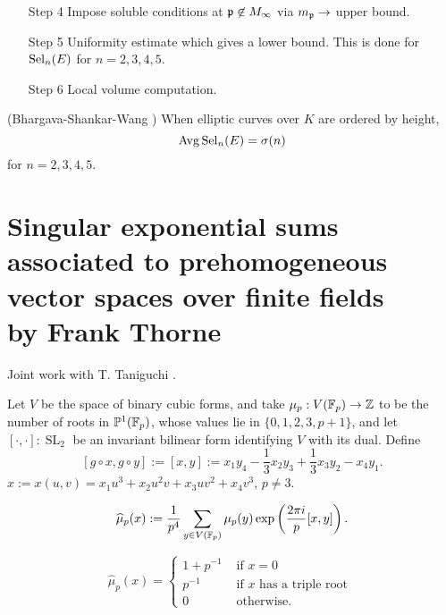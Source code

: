 \documentclass[12pt,amsfont]{amsart}
\begin{document}
\begin{itemize}
\begin{pbm}
\end{pbm}
\item[Step 4]
Impose soluble conditions at $\mathfrak{p} \not \in M_\infty$ via $m_{\mathfrak{p}} \rightarrow$ upper bound. 
\item[Step 5]
Uniformity estimate which gives a lower bound. This is done for $\operatorname{Sel}_n(E)$ for $n = 2, 3, 4, 5$. 
\item[Step 6]
Local volume computation. 

\end{itemize}

\begin{thm} (Bhargava-Shankar-Wang ) When elliptic curves over $K$ are ordered by height, 
\[\operatorname{Avg} \operatorname{Sel}_n(E) = \sigma(n) \]
for $n = 2, 3, 4, 5$. 
\end{thm}
\renewcommand{\thesubsection}{\arabic{section}.R}
\begingroup
\renewcommand{\addcontentsline}[3]{}%
\endgroup


\newpage
\section{Singular exponential sums associated to prehomogeneous vector spaces over finite fields \\
by Frank Thorne}\label{9}
\renewcommand{\thesubsection}{\arabic{section}.\arabic{subsection}}


Joint work with T. Taniguchi . 

\begin{xmp} Let $V$ be the space of binary cubic forms, and take $\mu_p: V({\mathbb F}_p) \rightarrow {\mathbb Z}$ to be the number of roots in $\mathbb{P}^1({\mathbb F}_p)$, whose values lie in $\{0,1,2,3, p+1\}$, and let $[ \cdot, \cdot] : \operatorname{SL}_2$ be an invariant bilinear form identifying $V$ with its dual. Define
\[
[g \circ x, g \circ y] := [x,y]:= x_1 y_4 - \frac{1}{3} x_2 y_3 + \frac{1}{3} x_3 y_2 - x_4 y_1.
\] 
$x := x(u,v) = x_1 u^3 + x_2 u^2 v + x_3 uv^2 + x_4 v^3$, $p \ne 3$. \end{xmp}
\[
\widehat{\mu}_p(x) := \frac{1}{p^4} \sum_{y \in V({\mathbb F}_p)} \mu_p(y) \exp\left(\frac{2\pi i}{p} [x,y]\right).
\]
\begin{pro}
\[
\widehat{\mu}_p(x) = \begin{cases} 1 + p^{-1} & \text{ if } x = 0 \\ p^{-1} & \text{ if } x \text{ has a triple root } \\ 0 & \text{ otherwise.} \end{cases} \]
\end{pro}
\end{document}
